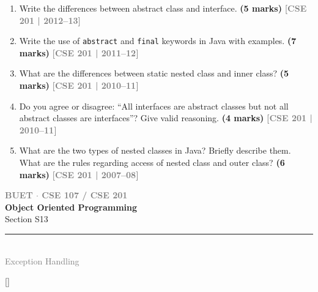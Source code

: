\documentclass[12pt,a3paper]{article}
\newcommand{\yr}[1]{\hfill\textcolor{gray}{\small\textbf{[#1]}}}
\newcommand{\mk}[1]{\textcolor{orange!70!black}{\small\textbf{(#1 marks)}}}
\newcommand{\secdivider}[4]{%
  \newpage\thispagestyle{empty}%
  \vspace*{\fill}%
  \begin{tcolorbox}[enhanced,colback=#4!7,colframe=#3,boxrule=1.5pt,arc=8pt,
    left=20pt,right=20pt,top=22pt,bottom=22pt,
    shadow={3pt}{-3pt}{0pt}{black!15}]
    \centering
    {\large\textcolor{gray}{\textbf{BUET $\cdot$ CSE 107 / CSE 201}}}\\[8pt]
    {\fontsize{26}{32}\selectfont\bfseries\textcolor{#3}{Object Oriented Programming}}\\[6pt]
    {\fontsize{15}{19}\selectfont\textcolor{dgray}{#1}}\\[12pt]
    \textcolor{#3!60}{\rule{0.5\textwidth}{0.5pt}}\\[6pt]
    {\small\textcolor{gray}{#2}}
  \end{tcolorbox}%
  \vspace*{\fill}\newpage%
}
\begin{document}
\begin{enumerate}



\item Write the differences between abstract class and interface. \mk{5}
\yr{CSE 201 | 2012--13}




\item Write the use of \texttt{abstract} and \texttt{final} keywords in Java with examples. \mk{7}
\yr{CSE 201 | 2011--12}




\item What are the differences between static nested class and inner class? \mk{5}
\yr{CSE 201 | 2010--11}




\item Do you agree or disagree: ``All interfaces are abstract classes but not all abstract classes are interfaces''? Give valid reasoning. \mk{4}
\yr{CSE 201 | 2010--11}




\item What are the two types of nested classes in Java? Briefly describe them. What are the rules regarding access of nested class and outer class? \mk{6}
\yr{CSE 201 | 2007--08}





\end{enumerate}
\newpage

\secdivider{Section S13}{Exception Handling}{cE}{cE}
\label{sec:S13}
\titleformat{\section}{\large\bfseries\color{cE}}{}{0em}{}[\titlerule]
\end{document}
